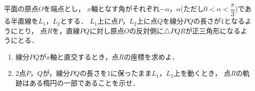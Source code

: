 \documentclass[../../main.tex]{subfiles}
\begin{document}
平面の原点$O$を端点とし，
$x$軸となす角がそれぞれ$-\alpha$，$\alpha$(ただし$\displaystyle 0<\alpha<\dfrac{\pi}{3}$)である半直線を$L_1$，$L_2$とする．
$L_1$上に点$P$，$L_2$上に点$Q$を線分$PQ$の長さが1となるようにとり，
点$R$を，直線$PQ$に対し原点$O$の反対側に$\triangle PQR$が正三角形になるようにとる．
\begin{enumerate}
  \item 線分$PQ$が$x$軸と直交するとき，点$R$の座標を求めよ．
  \item 2点$P$，$Q$が，線分$PQ$の長さを1に保ったまま$L_1$，$L_2$上を動くとき，
    点$R$の軌跡はある楕円の一部であることを示せ．
\end{enumerate}
\end{document}
